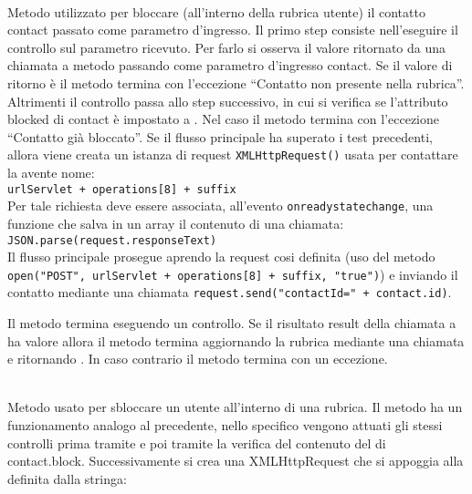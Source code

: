 \begin{description}
\item{}\\
Metodo utilizzato per bloccare (all'interno della rubrica utente) il contatto contact passato come parametro d'ingresso. Il primo step consiste nell'eseguire il controllo sul parametro ricevuto. Per farlo si osserva il valore ritornato da una chiamata a metodo  passando come parametro d'ingresso contact. Se il valore di ritorno è  il metodo termina con l'eccezione ``Contatto non presente nella rubrica''. Altrimenti il controllo passa allo step successivo, in cui si verifica se l'attributo blocked di contact è impostato a . Nel caso il metodo termina con l'eccezione ``Contatto già bloccato''. Se il flusso principale ha superato i test precedenti, allora viene creata un istanza di request \texttt{XMLHttpRequest()} usata per contattare la  avente nome:\\

\verb|urlServlet + operations[8] + suffix|\\

Per tale richiesta deve essere associata, all'evento \texttt{onreadystatechange}, una funzione che salva in un array il contenuto di una chiamata:\\

\verb|JSON.parse(request.responseText)|\\

Il flusso principale prosegue aprendo la request cosi definita (uso del metodo \texttt{open("POST", urlServlet + operations[8] + suffix, "true")}) e inviando il contatto mediante una chiamata \texttt{request.send("contactId=" + contact.id)}.

Il metodo termina eseguendo un controllo. Se il risultato result della chiamata a  ha valore  allora il metodo termina aggiornando la rubrica mediante una chiamata  e ritornando . In caso contrario il metodo termina con un eccezione.

\item{}\\
Metodo usato per sbloccare un utente all'interno di una rubrica. Il metodo ha un funzionamento analogo al precedente, nello specifico vengono attuati gli stessi controlli prima tramite  e poi tramite la verifica del contenuto del di contact.block. Successivamente si crea una XMLHttpRequest che si appoggia alla  definita dalla stringa:\\


\end{description}
